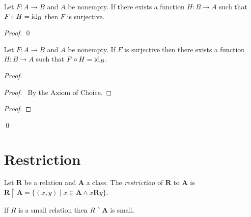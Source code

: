 \begin{theorem}
    Let $F : A \rightarrow B$ and $A$ be nonempty. If there exists a function
    $H : B \rightarrow A$ such that $F \circ H = \mathrm{id}_{B}$ then $F$
    is surjective.
\end{theorem}

\begin{proof}
    \pf
    \qed
\end{proof}

\begin{theorem}
    Let $F : A \rightarrow B$ and $A$ be nonempty. If $F$ is surjective
    then there exists a function $H : B \rightarrow A$ such that $F \circ H = \mathrm{id}_{B}$.
\end{theorem}

\begin{proof}
    \pf
    \begin{proof}
        \pf\ By the Axiom of Choice.
    \end{proof}
    \begin{proof}
    \end{proof}
    \qed
\end{proof}

\section{Restriction}

\begin{definition}
    Let $\mathbf{R}$ be a relation and $\mathbf{A}$ a class. 
    The \emph{restriction} of $\mathbf{R}$ to $\mathbf{A}$
    is $\mathbf{R} \restriction \mathbf{A} = 
    \{ (x,y) \mid x \in \mathbf{A} \wedge x\mathbf{R}y \}$.
\end{definition}

\begin{theorem}
    If $R$ is a small relation then $R \restriction \mathbf{A}$ is small.    
\end{theorem}

